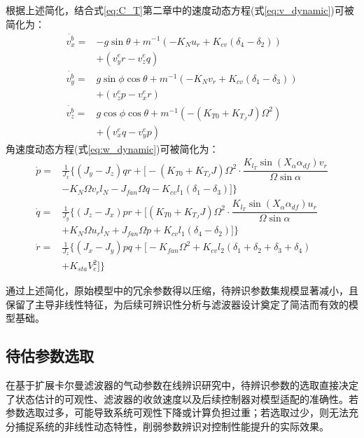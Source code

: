 根据上述简化，结合式\eqref{eq:C_T}第二章中的速度动态方程(式\eqref{eq:v_dynamic})可被简化为：
\begin{equation}
    \begin{aligned}
        \dot{v_x^b} =& -g\sin\theta + m^{-1}(-K_{N} u_r + K_{cv} (\delta_4 - \delta_2)) \\
        &+ (v_y^e r - v_z^e q)\\
        \dot{v_y^b} =& g\sin\phi\cos\theta + m^{-1}(-K_{N} v_r + K_{cv} (\delta_1 - \delta_3)) \\
        &+ (v_z^e p - v_x^e r)\\
        \dot{v_z^b} =& g\cos\phi\cos\theta + m^{-1}(-(K_{T0} + K_{T_J}J) \Omega^2) \\
        &+ (v_x^e q - v_y^e p)
    \end{aligned}
    \label{eq:v_dynamic_sim}
\end{equation}
角速度动态方程(式\eqref{eq:w_dynamic})可被简化为：
\begin{equation}
    \begin{aligned}
        \dot{p} = & \frac{1}{J_x} \biggl\{ (J_y - J_z)qr + \biggl[ - (K_{T0} + K_{T_J}J) \Omega^2 \cdot \dfrac{K_{l_T} \sin(X_\alpha \alpha_{df}) v_r}{\Omega \sin\alpha} \\
        & - K_{N} \Omega v_r l_N - J_{{fan}} \Omega q - K_{cv} l_1 (\delta_1 - \delta_3) \biggr] \biggr\} \\
        \dot{q} = & \frac{1}{J_y} \biggl\{(J_z - J_x)pr + \biggl[  (K_{T0} + K_{T_J}J) \Omega^2 \cdot \dfrac{K_{l_T} \sin(X_\alpha \alpha_{df}) u_r}{\Omega \sin\alpha} \\
        & + K_{N} \Omega u_r l_N + J_{{fan}} \Omega p + K_{cv} l_1 (\delta_4 - \delta_2) \biggr] \biggr\} \\
        \dot{r} = & \frac{1}{J_z} \biggl\{ (J_x - J_y)pq + \biggl[ - K_{fan} \Omega^2  + K_{cv} l_2 (\delta_1 + \delta_2 + \delta_3 + \delta_4) \\
        & + K_{sta} V_e^2 \biggr] \biggr\}
    \end{aligned}
    \label{eq:omega_dynamic_sim}
\end{equation}

通过上述简化，原始模型中的冗余参数得以压缩，待辨识参数集规模显著减小，且保留了主导非线性特征，为后续可辨识性分析与滤波器设计奠定了简洁而有效的模型基础。

\subsection{待估参数选取}
在基于扩展卡尔曼滤波器的气动参数在线辨识研究中，待辨识参数的选取直接决定了状态估计的可观性、滤波器的收敛速度以及后续控制器对模型适配的准确性。若参数选取过多，可能导致系统可观性下降或计算负担过重；若选取过少，则无法充分捕捉系统的非线性动态特性，削弱参数辨识对控制性能提升的实际效果。

